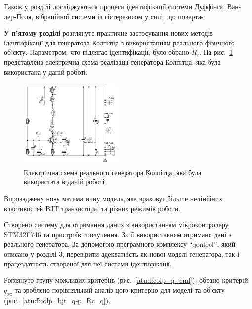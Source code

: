 \documentclass[a4paper,13pt]{atuaref}
\begin{document}
Також у розділі досліджуються процеси ідентифікації системи Дуффінга, Ван-дер-Поля,
вібраційної системи із гістерезисом у силі, що повертає.


\textbf{У п'ятому розділі}
розглянуте практичне застосування
нових методів ідентифікації для генератора Колпітца
з використанням реального фізичного об'єкту.
Параметром, что підлягає ідентифікації, було обрано $R_c$.
На рис.~\ref{atu:f:colp_schem_real} представлена електрична схема реалізації
генератора Колпітца, яка була використана у даній роботі.

\begin{figure}[htb!]
\centerline{\includegraphics[width=0.45\textwidth]{p6/p/colp_schem_real.png} }
\caption{Електрична схема реального генератора Колпітца, яка була використата в даній роботі}
\label{atu:f:colp_schem_real}
\end{figure}

Впроваджену нову математичну модель,
яка враховує більше нелінійних властивостей
BJT транзистора, та різних режимів роботи.


Створено систему для отримання даних з використанням мікроконтролеру STM32F746 та пристроїв сполучення.
За ії використанням отримано дані з реального
генератора, За допомогою програмного комплексу ``qontrol'',
який описано у розділі 3, перевірити адекватність як
нової моделі генератора,
так і працездатність створеної для неї системи ідентифікації.

Роглянуто групу можливих критеріїв (рис.~\ref{atu:f:colp_q_cml}),
обрано критерій $q_{xz}$
та зроблено порівняльний аналіз цого критерію
для моделі та об'єкту (рис.~\ref{atu:f:colp_bjt_q-p_Rc_q}).
\end{document}
